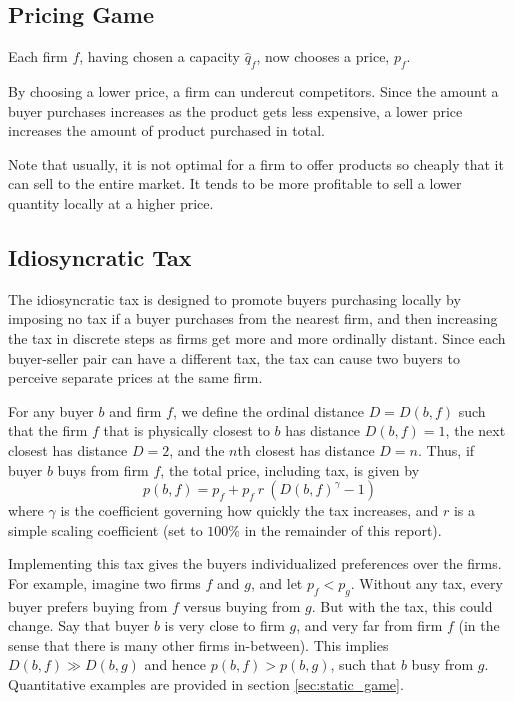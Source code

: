 \documentclass[final,3p,times,authoryear,12pt]{elsarticle}
\begin{document}
\subsection{Pricing Game}

Each firm $f$, having chosen a capacity $\hat q_f$, now chooses a price, $p_f$. 

By choosing a lower price, a firm can undercut competitors. 
Since the amount a buyer purchases increases as the product gets less expensive, a lower price increases the amount of product purchased in total. 

Note that usually, it is not optimal for a firm to offer products so cheaply that it can sell to the entire market. 
It tends to be more profitable to sell a lower quantity locally at a higher price.

\subsection{Idiosyncratic Tax}
The idiosyncratic tax is designed to promote buyers purchasing locally by
imposing no tax if a buyer purchases from the nearest firm, and then increasing
the tax in discrete steps as firms get more and more ordinally distant. Since
each buyer-seller pair can have a different tax, the tax can cause two buyers
to perceive separate prices at the same firm.

For any buyer $b$ and firm $f$, we define the ordinal distance $D = D(b,f)$
such that the firm $f$ that is physically closest to $b$ has distance
$D(b,f)=1$, the next closest has distance $D=2$, and the $n$th closest has
distance $D=n$.  Thus, if buyer $b$ buys from firm $f$, the total price,
including tax, is given by 
\begin{equation}
	p(b,f) = p_f + p_f ~ r~ \left( D(b,f)^\gamma - 1 \right)
\end{equation}
where $\gamma$ is the coefficient governing how quickly the tax increases, and
$r$ is a simple scaling coefficient (set to $100\%$ in the remainder of this
report). 

Implementing this tax gives the buyers individualized preferences over the firms. 
For example, imagine two firms $f$ and $g$, and let $p_f <p_g$. 
Without any tax, every buyer prefers buying from $f$ versus buying from $g$. 
But with the tax, this could change. 
Say that buyer $b$ is very close to firm $g$, and very far from firm $f$ (in the sense that there is many other firms in-between). 
This implies $D(b,f) \gg D(b,g)$ and hence $p(b,f) > p(b,g)$, such that $b$ busy from $g$. 
Quantitative examples are provided in section \ref{sec:static_game}. 
\end{document}
